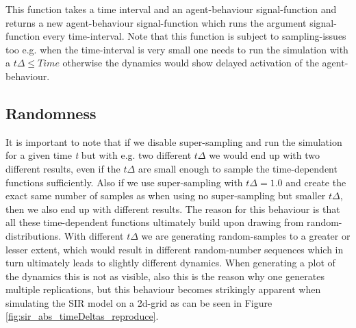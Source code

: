 This function takes a time interval and an agent-behaviour signal-function and returns a new agent-behaviour signal-function which runs the argument signal-function every time-interval. Note that this function is subject to sampling-issues too e.g. when the time-interval is very small one needs to run the simulation with a $t\Delta \leq Time$ otherwise the dynamics would show delayed activation of the agent-behaviour.

\subsection{Randomness}
It is important to note that if we disable super-sampling and run the simulation for a given time \textit{t} but with e.g. two different $t\Delta$ we would end up with two different results, even if the $t\Delta$ are small enough to sample the time-dependent functions sufficiently. Also if we use super-sampling with $t\Delta = 1.0$ and create the exact same number of samples as when using no super-sampling but smaller $t\Delta$, then we also end up with different results.
The reason for this behaviour is that all these time-dependent functions ultimately build upon drawing from random-distributions. With different $t\Delta$ we are generating random-samples to a greater or lesser extent, which would result in different random-number sequences which in turn ultimately leads to slightly different dynamics. When generating a plot of the dynamics this is not as visible, also this is the reason why one generates multiple replications, but this behaviour becomes strikingly apparent when simulating the SIR model on a 2d-grid as can be seen in Figure \ref{fig:sir_abs_timeDeltas_reproduce}.

